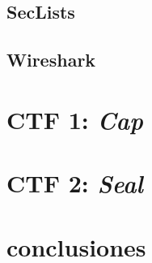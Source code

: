 \documentclass[a4paper, 12pt]{article} %
\begin{document}
\begin{otherlanguage}{spanish}
    \subsection{SecLists}
    
    
    \subsection{Wireshark}
    \newpage
    \section{\acrshort{CTF} 1: \textit{Cap}}
    
    
    \newpage
    \section{\acrshort{CTF} 2: \textit{Seal}}
    

    \newpage
    \section{conclusiones}
    
    \newpage
    \printbibliography[heading=bibnumbered] %

\end{otherlanguage}
\end{document}

